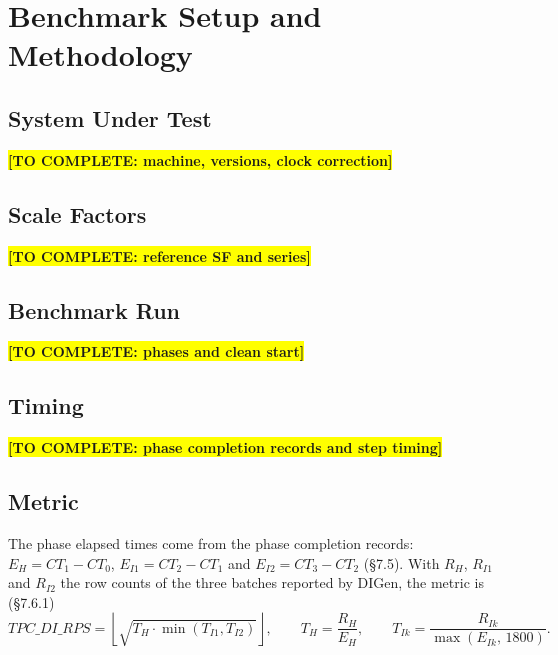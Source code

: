 \documentclass[11pt,a4paper]{article}
\newcommand{\todo}[1]{\colorbox{yellow}{\textbf{[TO COMPLETE: #1]}}}
\begin{document}
\section{Benchmark Setup and Methodology}
\label{sec:methodology}

\subsection{System Under Test}
\todo{machine, versions, clock correction}

\subsection{Scale Factors}
\todo{reference SF and series}

\subsection{Benchmark Run}
\todo{phases and clean start}

\subsection{Timing}
\todo{phase completion records and step timing}

\subsection{Metric}
\label{sec:metric}

The phase elapsed times come from the phase completion records:
$E_H = \mathit{CT}_1 - \mathit{CT}_0$, $E_{I1} = \mathit{CT}_2 - \mathit{CT}_1$ and
$E_{I2} = \mathit{CT}_3 - \mathit{CT}_2$ (\S7.5). With $R_H$, $R_{I1}$ and $R_{I2}$
the row counts of the three batches reported by DIGen, the metric is (\S7.6.1)
\[
  \mathit{TPC\_DI\_RPS} =
  \left\lfloor \sqrt{T_H \cdot \min(T_{I1}, T_{I2})} \right\rfloor,
  \qquad
  T_H = \frac{R_H}{E_H},
  \qquad
  T_{Ik} = \frac{R_{Ik}}{\max(E_{Ik},\, 1800)} .
\]
\end{document}
